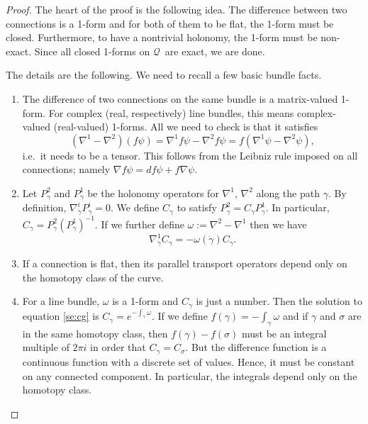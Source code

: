 \documentclass[11pt]{article}
\theoremstyle{remark}
\begin{document}
\begin{proof}
The heart of the proof is the following idea. The difference between
two connections is a 1-form and for both of them to be flat, the
1-form must be closed. Furthermore, to have a nontrivial holonomy, the
1-form must be non-exact. Since all closed 1-forms on \ensuremath{\mathcal{Q}}\ are exact, we
are done. 

The details are the following.
We need to recall a few basic bundle facts. 
\begin{enumerate}
\item The difference of
two connections on the same bundle is a matrix-valued
1-form. For complex (real, respectively) line bundles, 
this means complex-valued
(real-valued) 1-forms. 
All we need to check is that it satisfies 
 \[ (\nabla^1 - \nabla^2 )(f \ensuremath{\psi}) = \nabla^1 f\ensuremath{\psi} -
\nabla^2 f\ensuremath{\psi} = f(\nabla^1 \ensuremath{\psi} -
\nabla^2 \ensuremath{\psi}),\]
i.e.\ it needs to be a tensor.
 This follows from the  Leibniz rule imposed on all connections;
 namely  
$\nabla f\ensuremath{\psi} = df \ensuremath{\psi} + f \nabla \ensuremath{\psi}$.    
\item Let $P_{\gamma}^2$ and $P_{\gamma}^1$ be the holonomy operators 
for $\nabla^1$, $\nabla^2$ along the path $\gamma$. By definition,
$\nabla^i_{\dot{\gamma}} P_{\gamma}^i = 0$. We define $C_{\gamma}$ to
satisfy  $P_{\gamma}^2 = C_{\gamma}
P_{\gamma}^1$. In particular, $C_{\gamma} = P_{\gamma}^2
(P_{\gamma}^1)^{-1}$.
If we further define $\omega \ensuremath{:=}
\nabla^2 - \nabla^1$ then we have 
\begin{equation} \label{se:cg}
\nabla^1_{\dot{\gamma}} C_{\gamma} = -\omega(\dot{\gamma}) C_{\gamma}.
\end{equation}
\item If a connection is flat, then  its parallel transport
operators depend only on the homotopy
class of the curve. 
\item For a line bundle, $\omega$ is a 1-form and $C_{\gamma}$ is
just a number. Then the solution to equation
\eqref{se:cg} is $C_{\gamma} = e^{-\int_{\gamma} \omega}$.
If we   
define $f(\gamma) = -\int_{\gamma} \omega$ and
if $\gamma$ and   $\sigma$ are in the same
homotopy class, then $f(\gamma)- f(\sigma)$  must be an integral
multiple of $2\pi i$   
in order that $C_{\gamma} = C_{\sigma}$. But the difference function
 is a continuous function
with a discrete set of values. Hence, it must be constant on any
connected component. In particular, the integrals depend only on the
homotopy class.    
\end{enumerate}


\end{proof}
\end{document}
